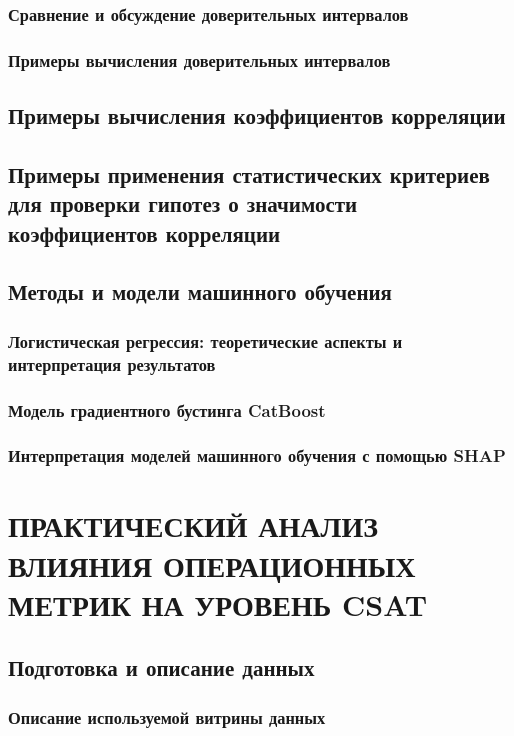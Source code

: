 \documentclass[a4paper,12pt]{article}
\begin{document}
\subsubsection{Сравнение и обсуждение доверительных интервалов}
\subsubsection{Примеры вычисления доверительных интервалов}

\subsection{Примеры вычисления коэффициентов корреляции}
\subsection{Примеры применения статистических критериев для проверки гипотез о значимости коэффициентов корреляции}

\subsection{Методы и модели машинного обучения}
\subsubsection{Логистическая регрессия: теоретические аспекты и интерпретация результатов}
\subsubsection{Модель градиентного бустинга CatBoost}
\subsubsection{Интерпретация моделей машинного обучения с помощью SHAP}

\section{ПРАКТИЧЕСКИЙ АНАЛИЗ ВЛИЯНИЯ ОПЕРАЦИОННЫХ МЕТРИК НА УРОВЕНЬ CSAT}

\subsection{Подготовка и описание данных}
\subsubsection{Описание используемой витрины данных}
\end{document}
